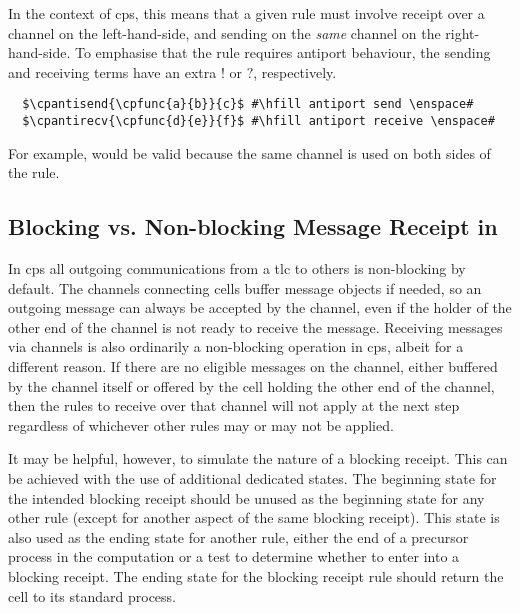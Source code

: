 In the context of \gls{cps}, this means that a given rule must involve receipt over a channel on the left-hand-side, and sending on the \emph{same} channel on the right-hand-side.  To emphasise that the rule requires antiport behaviour, the sending and receiving terms have an extra \(!\) or \(?\), respectively.

\lstset{xleftmargin=.5in, xrightmargin=.5in} 
\begin{lstlisting}
  $\cpantisend{\cpfunc{a}{b}}{c}$ #\hfill antiport send \enspace#
  $\cpantirecv{\cpfunc{d}{e}}{f}$ #\hfill antiport receive \enspace#
\end{lstlisting}

For example,  would be valid because the same channel is used on both sides of the rule.

\subsection{\label{sec:cps:blocking}Blocking vs. Non-blocking Message Receipt in }

In \gls{cps} all outgoing communications from a \gls{tlc} to others is non-blocking by default.  The channels connecting cells buffer message objects if needed, so an outgoing message can always be accepted by the channel, even if the holder of the other end of the channel is not ready to receive the message.  Receiving messages via channels is also ordinarily a non-blocking operation in \gls{cps}, albeit for a different reason.  If there are no eligible messages on the channel, either buffered by the channel itself or offered by the cell holding the other end of the channel, then the rules to receive over that channel will not apply at the next step regardless of whichever other rules may or may not be applied.

It may be helpful, however, to simulate the nature of a blocking receipt.  This can be achieved with the use of additional dedicated states.  The beginning state for the intended blocking receipt should be unused as the beginning state for any other rule (except for another aspect of the same blocking receipt).  This state is also used as the ending state for another rule, either the end of a precursor process in the computation or a test to determine whether to enter into a blocking receipt.  The ending state for the blocking receipt rule should return the cell to its standard process.

